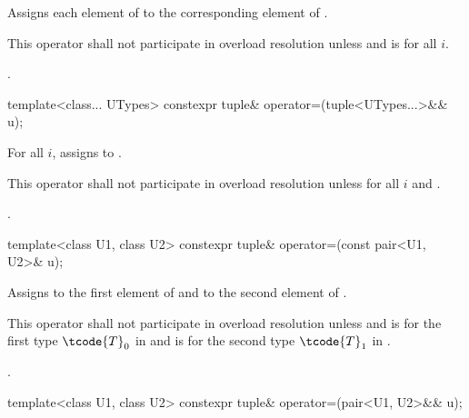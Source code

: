 \begin{itemdescr}
\pnum
\effects Assigns each element of  to the corresponding element
of .

\pnum
\remarks This operator shall not participate in overload resolution unless
 and
 is  for all $i$.

\pnum
\returns {}.
\end{itemdescr}

%
\begin{itemdecl}
template<class... UTypes> constexpr tuple& operator=(tuple<UTypes...>&& u);
\end{itemdecl}

\begin{itemdescr}
\pnum
\effects For all $i$, assigns  to
.

\pnum
\remarks This operator shall not participate in overload resolution unless
 for all $i$ and
.

\pnum
\returns {}.
\end{itemdescr}

%
%
\begin{itemdecl}
template<class U1, class U2> constexpr tuple& operator=(const pair<U1, U2>& u);
\end{itemdecl}

\begin{itemdescr}
\pnum
\effects  Assigns  to the first element of 
and  to the second element of .

\pnum
\remarks This operator shall not participate in overload resolution unless
 and
 is  for the first type $\tcode{T}_0$ in
 and  is  for the
second type $\tcode{T}_1$ in .

\pnum
\returns {}.
\end{itemdescr}

%
%
\begin{itemdecl}
template<class U1, class U2> constexpr tuple& operator=(pair<U1, U2>&& u);
\end{itemdecl}

